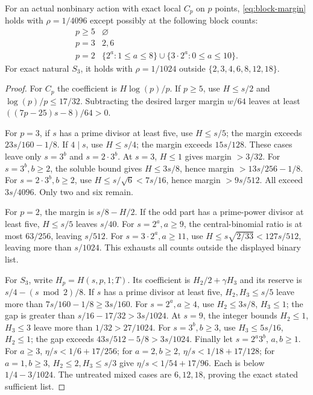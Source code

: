 \begin{theorem}
\label{thm:prime-s3-capacity}
For an actual nonbinary action with exact local $C_p$ on $p$ points,
\eqref{eq:block-margin} holds with $\rho=1/4096$ except possibly at
the following block counts:
\[
 \begin{array}{c|l}
 p\geq5&\varnothing\\
 p=3&2,6\\
 p=2&\{2^a:1\leq a\leq8\}\cup\{3\cdot2^a:0\leq a\leq10\}.
 \end{array}
\]
For exact natural $S_3$, it holds with $\rho=1/1024$ outside
$\{2,3,4,6,8,12,18\}$.
\end{theorem}
\begin{proof}
For $C_p$ the coefficient is $H\log(p)/p$.
If $p\geq5$, use $H\leq s/2$ and $\log(p)/p\leq17/32$.
Subtracting the desired larger margin $w/64$ leaves at least
$((7p-25)s-8)/64>0$.

For $p=3$, if $s$ has a prime divisor at least five, use $H\leq s/5$;
the margin exceeds $23s/160-1/8$. If $4\mid s$, use $H\leq s/4$;
the margin exceeds $15s/128$. These cases leave only $s=3^b$ and
$s=2\cdot3^b$. At $s=3$, $H\leq1$ gives margin $>3/32$.
For $s=3^b,b\geq2$, the soluble bound gives $H\leq3s/8$, hence
margin $>13s/256-1/8$. For $s=2\cdot3^b,b\geq2$, use
$H\leq s/\sqrt6<7s/16$, hence margin $>9s/512$.
All exceed $3s/4096$. Only two and six remain.

For $p=2$, the margin is $s/8-H/2$. If the odd part has a
prime-power divisor at least five, $H\leq s/5$ leaves $s/40$.
For $s=2^a,a\geq9$, the central-binomial ratio is at most
$63/256$, leaving $s/512$. For $s=3\cdot2^a,a\geq11$, use
$H\leq s\sqrt{2/33}<127s/512$, leaving more than $s/1024$.
This exhausts all counts outside the displayed binary list.

For $S_3$, write $H_p=H(s,p,1;T)$. Its coefficient is
$H_2/2+\gamma H_3$ and its reserve is $s/4-(s\bmod2)/8$.
If $s$ has a prime divisor at least five, $H_2,H_3\leq s/5$
leave more than $7s/160-1/8\geq3s/160$.
For $s=2^a,a\geq4$, use $H_2\leq3s/8$, $H_3\leq1$;
the gap is greater than $s/16-17/32>3s/1024$.
At $s=9$, the integer bounds $H_2\leq1$, $H_3\leq3$ leave
more than $1/32>27/1024$. For $s=3^b,b\geq3$, use
$H_3\leq5s/16$, $H_2\leq1$; the gap exceeds
$43s/512-5/8>3s/1024$.
Finally let $s=2^a3^b$, $a,b\geq1$. For $a\geq3$,
$\eta/s<1/6+17/256$; for $a=2,b\geq2$,
$\eta/s<1/18+17/128$; for $a=1,b\geq3$,
$H_2\leq2,H_3\leq s/3$ give $\eta/s<1/54+17/96$.
Each is below $1/4-3/1024$. The untreated mixed cases are
$6,12,18$, proving the exact stated sufficient list.
\end{proof}

